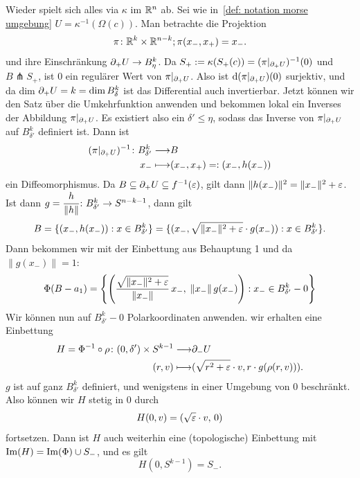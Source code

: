 \begin{bigproof}
    \begin{smallproof}
        Wieder spielt sich alles via $\kappa$ im ${ \mathbb R }^n$ ab. Sei wie 
        in~\ref{def: notation morse umgebung} $U = \kappa^{-1}(\Omega (c))$.
        Man betrachte die Projektion
        \[ \pi \colon { \mathbb R }^k \times { \mathbb R }^{n - k} ; \pi (x_-, x_+) = x_- . \]
        und ihre Einschränkung ${ \partial }_+ U \to B_{\eta}^k$.
         Da $S_+ := \kappa(S_+(c)) = (\pi|_{{ \partial }_+U})^{-1}(0)$
        und $B \pitchfork S_+$, ist $0$ ein regulärer Wert von $\pi|_{{ \partial }_+U}$.
        Also ist ${ \operatorname{d} } ( \pi|_{{ \partial }_+U} )(0)$ surjektiv, und da dim ${ \partial }_+U = k = \dim B^k_{\delta}$ ist
        das Differential auch invertierbar. Jetzt können wir den Satz über die Umkehrfunktion anwenden 
        und bekommen lokal ein Inverses der Abbildung $\pi|_{{ \partial }_+U}$. Es existiert also ein 
        $\delta' \leq \eta$, sodass das Inverse von $\pi|_{{ \partial }_+U}$ auf $B^k_{\delta'}$ definiert 
        ist. Dann ist 
        \begin{align*}
            (\pi|_{{ \partial }_+U})^{-1} \colon B^k_{\delta'} \longrightarrow & B \\
            x_- \longmapsto & (x_-, x_+) =: (x_-, h(x_-))
        \end{align*}
        ein Diffeomorphismus. Da $B \subseteq { \partial }_+U \subseteq f^{-1}(\varepsilon)$, gilt dann 
        $\| h(x_-) \|^2 = \| x_- \|^2 + \varepsilon $. Ist dann 
        $g = \cfrac{h}{\| h \|} \colon B^k_{\delta'} \to S^{n - k - 1}$, dann gilt
        \[ B = \{ (x_-, h(x_-)): x \in B^k_{\delta'} \} 
            = \{ (x_-, \sqrt{\| x_- \|^2 + \varepsilon} \cdot g(x_-)): x \in B^k_{\delta'} \} . \]
        Dann bekommen wir mit der Einbettung aus Behauptung 1 und da $\| g(x_-) \| = 1$:
        \[ \Phi(B - a_1) = 
            \left\{ \left( \frac{\sqrt{\| x_- \|^2 + \varepsilon}}{\| x_- \|} \, x_-, \; 
                    \| x_- \| \, g(x_-) \right) : 
                x_- \in B^k_{\delta'} - 0 \right\} \]
        Wir können nun auf $B^k_{\delta'} - 0$ Polarkoordinaten anwenden. wir erhalten eine 
        Einbettung
        \begin{align*}
            H = \Phi^{-1} \circ \rho \colon (0, \delta') \times S^{k-1} \longrightarrow & { \partial }_- U \\
            (r, v) \longmapsto & ( \sqrt{r^2 + \varepsilon} \cdot v, r \cdot g(\rho(r, v))) .
        \end{align*}
        $g$ ist auf ganz $B^k_{\delta'}$ definiert, und wenigstens in einer Umgebung von $0$ 
        beschränkt. Also können wir $H$ stetig in $0$ durch
        \[ H(0, v) = (\sqrt{\varepsilon} \cdot v, \, 0) \]
        fortsetzen. Dann ist $H$ auch weiterhin eine (topologische) Einbettung mit 
        ${ \operatorname{Im} } (H) = { \operatorname{Im} } (\Phi) \cup S_- $, und es gilt 
        \[ H(0, S^{k - 1}) = S_- . \]
    \end{smallproof}


\end{bigproof}
